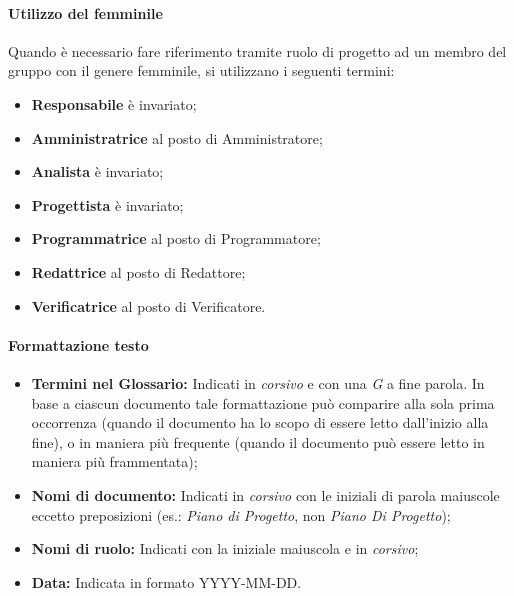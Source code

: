 \paragraph{Utilizzo del femminile}
Quando è necessario fare riferimento tramite ruolo di progetto ad un membro del gruppo con il genere femminile, si utilizzano i seguenti termini:
\begin{itemize}
  \item \textbf{Responsabile} è invariato;
  \item \textbf{Amministratrice} al posto di Amministratore;
  \item \textbf{Analista} è invariato;
  \item \textbf{Progettista} è invariato;
  \item \textbf{Programmatrice} al posto di Programmatore;
  \item \textbf{Redattrice} al posto di Redattore;
  \item \textbf{Verificatrice} al posto di Verificatore.
\end{itemize}

\paragraph{Formattazione testo}
\begin{itemize}
  \item \textbf{Termini nel Glossario:} Indicati in \textit{corsivo} e con una \textit{\small{G}} a fine parola. In base a ciascun documento tale formattazione può comparire alla sola prima occorrenza (quando il documento ha lo scopo di essere letto dall'inizio alla fine), o in maniera più frequente (quando il documento può essere letto in maniera più frammentata);
  \item \textbf{Nomi di documento:} Indicati in \textit{corsivo} con le iniziali di parola maiuscole eccetto preposizioni (es.: \textit{Piano di Progetto}, non \textit{Piano Di Progetto});
  \item \textbf{Nomi di ruolo:} Indicati con la iniziale maiuscola e in \textit{corsivo};
  \item \textbf{Data:} Indicata in formato YYYY-MM-DD.
\end{itemize}

